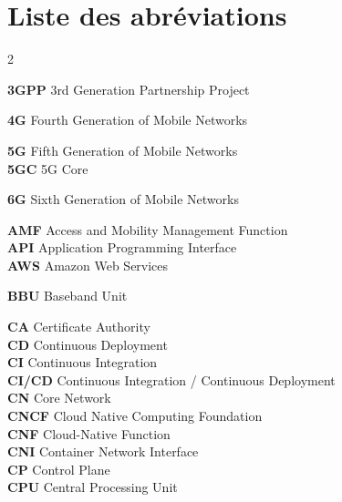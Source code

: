 \chapter*{\textbf{Liste des abréviations}}

\setlength{\columnsep}{0.8cm}

\begin{multicols}{2}
	
	\newcommand{\sectionletter}[1]{%
		\noindent\makebox[\linewidth]{%
			\textcolor{black}{%
				\rule{4cm}{1.5pt}\hspace{0.5em}%
				{\bfseries\itshape\Large #1}%
				\hspace{0.5em}\rule{3cm}{1.5pt}%
			}%
		}
	}

\sectionletter{3}
\textbf{3GPP} \quad 3rd Generation Partnership Project\\
\sectionletter{4}
\textbf{4G} \quad Fourth Generation of Mobile Networks\\
\sectionletter{5}
\textbf{5G} \quad Fifth Generation of Mobile Networks\\
\textbf{5GC} \quad 5G Core\\
\sectionletter{6}
\textbf{6G} \quad Sixth Generation of Mobile Networks\\
\sectionletter{A}
\textbf{AMF} \quad Access and Mobility Management Function\\
\textbf{API} \quad Application Programming Interface\\
\textbf{AWS} \quad Amazon Web Services\\
\sectionletter{B}
\textbf{BBU} \quad Baseband Unit\\
\sectionletter{C}
\textbf{CA} \quad Certificate Authority\\
\textbf{CD} \quad Continuous Deployment\\
\textbf{CI} \quad Continuous Integration\\
\textbf{CI/CD} \quad Continuous Integration / Continuous Deployment\\
\textbf{CN} \quad Core Network\\
\textbf{CNCF} \quad Cloud Native Computing Foundation\\
\textbf{CNF} \quad Cloud-Native Function\\
\textbf{CNI} \quad Container Network Interface\\
\textbf{CP} \quad Control Plane\\
\textbf{CPU} \quad Central Processing Unit\\

\end{multicols}
